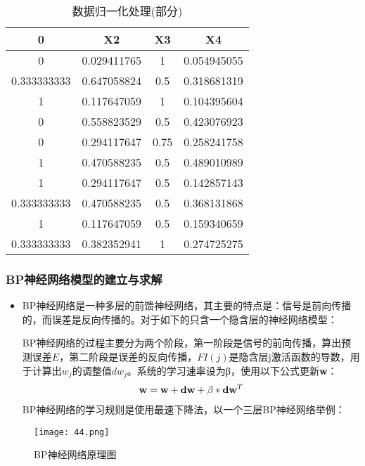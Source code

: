 \documentclass[12pt,a4paper]{nmmcm}
\begin{document}
\begin{table}[H]
    \centering
    \begin{tabular}{cccc}
\hline
        0	&X2&	X3&	X4\\
\hline
0	&0.029411765&	1	&0.054945055\\
0.333333333	&0.647058824	&0.5&	0.318681319\\
1	&0.117647059	&1&0.104395604\\
0	&0.558823529&	0.5&	0.423076923\\
0	&0.294117647	&0.75&	0.258241758\\
1&	0.470588235&	0.5&	0.489010989\\
1	&0.294117647&	0.5&	0.142857143\\
0.333333333&	0.470588235&	0.5&	0.368131868\\
1	&0.117647059&	0.5	&0.159340659\\
0.333333333	&0.382352941	&1&	0.274725275\\
\hline
    \end{tabular}
    \caption{数据归一化处理(部分)}
    \label{tab:my_label}
\end{table}

\subsubsection{BP神经网络模型的建立与求解}
\begin{itemize}
   \item
BP神经网络是一种多层的前馈神经网络，其主要的特点是：信号是前向传播的，而误差是反向传播的。对于如下的只含一个隐含层的神经网络模型：

BP神经网络的过程主要分为两个阶段，第一阶段是信号的前向传播，算出预测误差$E$，第二阶段是误差的反向传播，$FI(j)$是隐含层j激活函数的导数，用于计算出$w_{j}$的调整值$dw_{j}$。系统的学习速率设为β，使用以下公式更新{\bf{w}}：
\begin{equation}
\begin{aligned}
\centering
{\bf{w}} = {\bf{w}} + {\bf{dw}} + {\bf{\beta}}*{\bf{d}}{{\bf{w}}^T}
\end{aligned}
\end{equation}
BP神经网络的学习规则是使用最速下降法，以一个三层BP神经网络举例：
\end{itemize}
\begin{figure}[H]
    \centering
    \texttt{[image: 44.png]}
    \caption{BP神经网络原理图}
    \label{fig:enter-label}
\end{figure}
\end{document}
